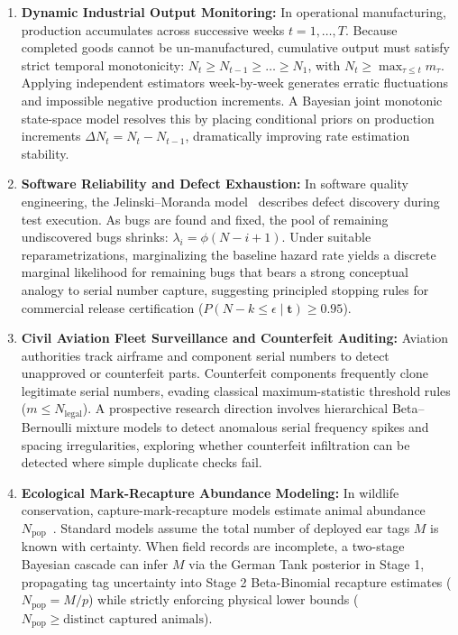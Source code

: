 \documentclass[10pt,a4paper]{article}
\begin{document}
\begin{enumerate}
    \item \textbf{Dynamic Industrial Output Monitoring:} In operational manufacturing, production accumulates across successive weeks $t = 1, \dots, T$. Because completed goods cannot be un-manufactured, cumulative output must satisfy strict temporal monotonicity: $N_t \ge N_{t-1} \ge \dots \ge N_1$, with $N_t \ge \max_{\tau \le t} m_\tau$. Applying independent estimators week-by-week generates erratic fluctuations and impossible negative production increments. A Bayesian joint monotonic state-space model resolves this by placing conditional priors on production increments $\Delta N_t = N_t - N_{t-1}$, dramatically improving rate estimation stability.
    \item \textbf{Software Reliability and Defect Exhaustion:} In software quality engineering, the Jelinski--Moranda model~\cite{jelinski1972,musa1975} describes defect discovery during test execution. As bugs are found and fixed, the pool of remaining undiscovered bugs shrinks: $\lambda_i = \phi(N - i + 1)$. Under suitable reparametrizations, marginalizing the baseline hazard rate yields a discrete marginal likelihood for remaining bugs that bears a strong conceptual analogy to serial number capture, suggesting principled stopping rules for commercial release certification ($P(N - k \le \epsilon \mid \mathbf{t}) \ge 0.95$).
    \item \textbf{Civil Aviation Fleet Surveillance and Counterfeit Auditing:} Aviation authorities track airframe and component serial numbers to detect unapproved or counterfeit parts. Counterfeit components frequently clone legitimate serial numbers, evading classical maximum-statistic threshold rules ($m \le N_{\text{legal}}$). A prospective research direction involves hierarchical Beta--Bernoulli mixture models to detect anomalous serial frequency spikes and spacing irregularities, exploring whether counterfeit infiltration can be detected where simple duplicate checks fail.
    \item \textbf{Ecological Mark-Recapture Abundance Modeling:} In wildlife conservation, capture-mark-recapture models estimate animal abundance $N_{\text{pop}}$~\cite{otis1978}. Standard models assume the total number of deployed ear tags $M$ is known with certainty. When field records are incomplete, a two-stage Bayesian cascade can infer $M$ via the German Tank posterior in Stage 1, propagating tag uncertainty into Stage 2 Beta-Binomial recapture estimates ($N_{\text{pop}} = M/p$) while strictly enforcing physical lower bounds ($N_{\text{pop}} \ge \text{distinct captured animals}$).
\end{enumerate}
\end{document}
